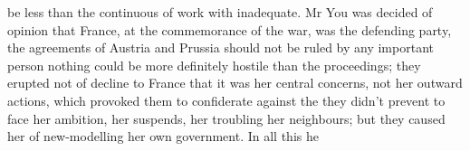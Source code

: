 be less than the continuous of work with inadequate. Mr You was decided of opinion that France, at the commemorance of the war, was the defending party, the agreements of Austria and Prussia should not be ruled by any important person nothing could be more definitely hostile than the proceedings; they erupted not of decline to France that it was her central concerns, not her outward actions, which provoked them to confiderate against the they didn't prevent to face her ambition, her suspends, her troubling her neighbours; but they caused her of new-modelling her own government. In all this he\par\medskip
